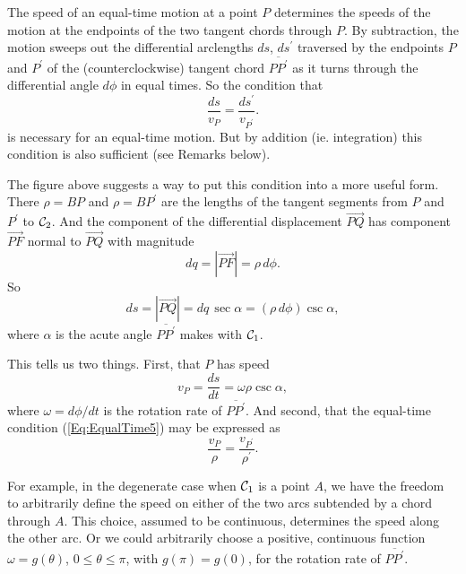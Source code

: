 \documentclass{ximera}
\begin{document}
The speed of an equal-time motion at a point $P$ determines the speeds of the motion at the endpoints of the two tangent chords through $P$. By subtraction, the motion sweeps out the differential arclengths $ds$, $ds^\prime$ traversed by the endpoints $P$ and $P^\prime$ of the (counterclockwise) tangent chord $\overline{PP^\prime}$ as it turns through the differential angle $d\phi$ in equal times.   So the condition that %
\begin{equation}
  \frac{ds}{v_P} = \frac{ds^\prime}{v_{P^\prime}}.   \label{Eq:EqualTime5}
\end{equation}
is necessary for an equal-time motion. But by addition (ie. integration) this condition is also sufficient (see Remarks below).

The figure above suggests a way to put this condition into a more useful form. There $\rho = BP$ and $\rho = BP^\prime$ are the lengths of the tangent segments from $P$ and $P^\prime$ to ${\cal C}_2$. And the component of the differential displacement $\overrightarrow{PQ}$ has component $\overrightarrow{PF}$ normal to $\overrightarrow{PQ}$ with magnitude
\[
   dq = |\overrightarrow{PF}| = \rho \, d\phi.
\]
So
\[
     ds = |\overrightarrow{PQ}| = dq \, \sec\alpha = (\rho \, d\phi) \csc\alpha ,
\]
where $\alpha$ is the acute angle $\overline{PP^\prime}$ makes with ${\cal C}_1$.

This tells us two things. First, that $P$ has speed
\[
   v_P = \frac{ds}{dt} = \omega \rho \csc\alpha ,
\]
where $\omega = d\phi/dt$ is the rotation rate of $\overline{PP^\prime}$. And second, that the equal-time condition (\ref{Eq:EqualTime5}) may be expressed as
\begin{equation}
    \frac{v_P}{\rho} = \frac{v_{P^\prime}}{\rho^\prime} .   \label{Eq:EqualTime23}
\end{equation}

For example, in the degenerate case when ${\cal C}_1$ is a point $A$, we have the freedom to arbitrarily define the speed on either of the two arcs subtended by a chord through $A$. This choice, assumed to be continuous, determines the speed along the other arc. Or we could arbitrarily choose a positive, continuous function $\omega  = g(\theta)$, $0\leq \theta \leq \pi$, with $g(\pi) = g(0)$, for the rotation rate of $\overline{PP^\prime}$.
\end{document}
